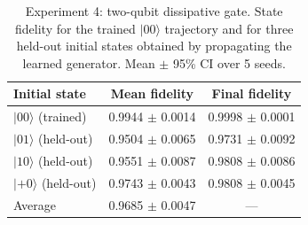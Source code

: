 \begin{table}[ht]
\centering
\caption{Experiment 4: two-qubit dissipative gate. State fidelity for the trained $\lvert 00\rangle$ trajectory and for three held-out initial states obtained by propagating the learned generator. Mean $\pm$ 95\% CI over 5 seeds.}
\label{tab:exp4}
\begin{tabular}{lcc}
\toprule
Initial state & Mean fidelity & Final fidelity \\
\midrule
$\lvert 00\rangle$ (trained) & 0.9944 $\pm$ 0.0014 & 0.9998 $\pm$ 0.0001 \\
$\lvert 01\rangle$ (held-out) & 0.9504 $\pm$ 0.0065 & 0.9731 $\pm$ 0.0092 \\
$\lvert 10\rangle$ (held-out) & 0.9551 $\pm$ 0.0087 & 0.9808 $\pm$ 0.0086 \\
$\lvert {+}0\rangle$ (held-out) & 0.9743 $\pm$ 0.0043 & 0.9808 $\pm$ 0.0045 \\
\midrule
Average & 0.9685 $\pm$ 0.0047 & --- \\
\bottomrule
\end{tabular}
\end{table}
